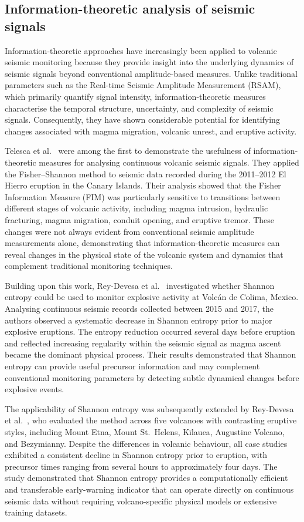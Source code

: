 \documentclass[12pt,a4paper]{article}
\begin{document}
\subsection{Information-theoretic analysis of seismic signals}

Information-theoretic approaches have increasingly been applied to volcanic seismic monitoring because they provide insight into the underlying dynamics of seismic signals beyond conventional amplitude-based measures. Unlike traditional parameters such as the Real-time Seismic Amplitude Measurement (RSAM), which primarily quantify signal intensity, information-theoretic measures characterise the temporal structure, uncertainty, and complexity of seismic signals. Consequently, they have shown considerable potential for identifying changes associated with magma migration, volcanic unrest, and eruptive activity.

Telesca et al.~\cite{Telesca2014} were among the first to demonstrate the usefulness of information-theoretic measures for analysing continuous volcanic seismic signals. They applied the Fisher--Shannon method to seismic data recorded during the 2011--2012 El Hierro eruption in the Canary Islands. Their analysis showed that the Fisher Information Measure (FIM) was particularly sensitive to transitions between different stages of volcanic activity, including magma intrusion, hydraulic fracturing, magma migration, conduit opening, and eruptive tremor. These changes were not always evident from conventional seismic amplitude measurements alone, demonstrating that information-theoretic measures can reveal changes in the physical state of the volcanic system and dynamics that complement traditional monitoring techniques.

Building upon this work, Rey-Devesa et al.~\cite{ReyDevesa2023} investigated whether Shannon entropy could be used to monitor explosive activity at Volc\'an de Colima, Mexico. Analysing continuous seismic records collected between 2015 and 2017, the authors observed a systematic decrease in Shannon entropy prior to major explosive eruptions. The entropy reduction occurred several days before eruption and reflected increasing regularity within the seismic signal as magma ascent became the dominant physical process. Their results demonstrated that Shannon entropy can provide useful precursor information and may complement conventional monitoring parameters by detecting subtle dynamical changes before explosive events.

The applicability of Shannon entropy was subsequently extended by Rey-Devesa et al.~\cite{ReyDevesa2023JGR}, who evaluated the method across five volcanoes with contrasting eruptive styles, including Mount Etna, Mount St.~Helens, Kīlauea, Augustine Volcano, and Bezymianny. Despite the differences in volcanic behaviour, all case studies exhibited a consistent decline in Shannon entropy prior to eruption, with precursor times ranging from several hours to approximately four days. The study demonstrated that Shannon entropy provides a computationally efficient and transferable early-warning indicator that can operate directly on continuous seismic data without requiring volcano-specific physical models or extensive training datasets.
\end{document}
